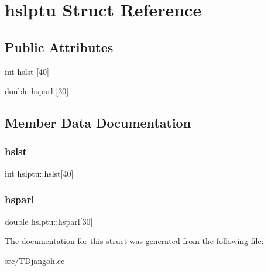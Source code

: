 \hypertarget{structhslptu}{}\section{hslptu Struct Reference}
\label{structhslptu}
\subsection*{Public Attributes}
\begin{DoxyCompactItemize}
\item 
int \hyperlink{structhslptu_afc5db6733978160dc8ce6cd498dc473b}{hslst} \mbox{[}40\mbox{]}
\item 
double \hyperlink{structhslptu_a238859c38d755eec8464539f3b48295a}{hsparl} \mbox{[}30\mbox{]}
\end{DoxyCompactItemize}


\subsection{Member Data Documentation}
\mbox{\label{structhslptu_afc5db6733978160dc8ce6cd498dc473b}} 
\subsubsection{\texorpdfstring{hslst}{hslst}}
{\footnotesize\ttfamily int hslptu\+::hslst\mbox{[}40\mbox{]}}

\mbox{\label{structhslptu_a238859c38d755eec8464539f3b48295a}} 
\subsubsection{\texorpdfstring{hsparl}{hsparl}}
{\footnotesize\ttfamily double hslptu\+::hsparl\mbox{[}30\mbox{]}}



The documentation for this struct was generated from the following file\+:\begin{DoxyCompactItemize}
\item 
src/\hyperlink{_t_djangoh_8cc}{T\+Djangoh.\+cc}\end{DoxyCompactItemize}
